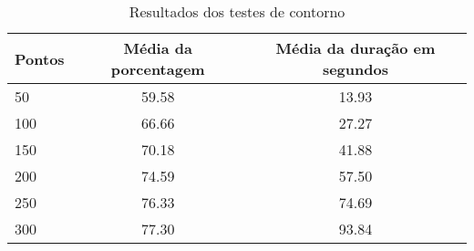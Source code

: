 \begin{table}[h]
    \centering
    \caption{Resultados dos testes de contorno}
    \label{tab:resultados-contorno}
    \begin{tabular}{|l|c|c|}
        \hline
        {Pontos} & {Média da porcentagem} & {Média da duração em segundos} \\
        \hline
        50 & 59.58 & 13.93\\
        100 & 66.66 & 27.27\\
        150 & 70.18 & 41.88\\
        200 & 74.59 & 57.50\\
        250 & 76.33 & 74.69\\
        300 & 77.30 & 93.84\\
        \hline
    \end{tabular}
\end{table}